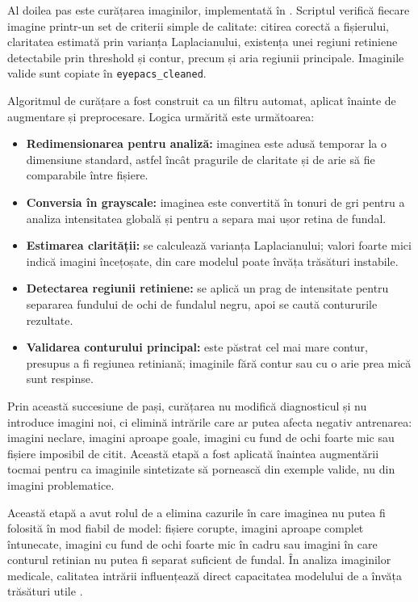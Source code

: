 \documentclass[12pt, a4paper, twoside, romanian]{teza-upb}
\begin{document}
Al doilea pas este curățarea imaginilor, implementată în . Scriptul
verifică fiecare imagine printr-un set de criterii simple de calitate: citirea corectă a
fișierului, claritatea estimată prin varianța Laplacianului, existența unei regiuni retiniene
detectabile prin threshold și contur, precum și aria regiunii principale. Imaginile valide
sunt copiate în \texttt{eyepacs\_cleaned}.
\bigskip

Algoritmul de curățare a fost construit ca un filtru automat, aplicat înainte de augmentare și
preprocesare. Logica urmărită este următoarea:

\begin{itemize}
  \item \textbf{Redimensionarea pentru analiză:} imaginea este adusă temporar la o dimensiune standard, astfel încât pragurile de claritate și de arie să fie comparabile între fișiere.
  \item \textbf{Conversia în grayscale:} imaginea este convertită în tonuri de gri pentru a analiza intensitatea globală și pentru a separa mai ușor retina de fundal.
  \item \textbf{Estimarea clarității:} se calculează varianța Laplacianului; valori foarte mici indică imagini încețoșate, din care modelul poate învăța trăsături instabile.
  \item \textbf{Detectarea regiunii retiniene:} se aplică un prag de intensitate pentru separarea fundului de ochi de fundalul negru, apoi se caută contururile rezultate.
  \item \textbf{Validarea conturului principal:} este păstrat cel mai mare contur, presupus a fi regiunea retiniană; imaginile fără contur sau cu o arie prea mică sunt respinse.
\end{itemize}
\bigskip

Prin această succesiune de pași, curățarea nu modifică diagnosticul și nu introduce imagini noi,
ci elimină intrările care ar putea afecta negativ antrenarea: imagini neclare, imagini aproape
goale, imagini cu fund de ochi foarte mic sau fișiere imposibil de citit. Această etapă a fost
aplicată înaintea augmentării tocmai pentru ca imaginile sintetizate să pornească din exemple
valide, nu din imagini problematice.
\bigskip

Această etapă a avut rolul de a elimina cazurile în care imaginea nu putea fi folosită în mod
fiabil de model: fișiere corupte, imagini aproape complet întunecate, imagini cu fund de ochi
foarte mic în cadru sau imagini în care conturul retinian nu putea fi separat suficient de
fundal. În analiza imaginilor medicale, calitatea intrării influențează direct capacitatea
modelului de a învăța trăsături utile \cite{14_liu2022deepdrid}.
\bigskip
\end{document}
